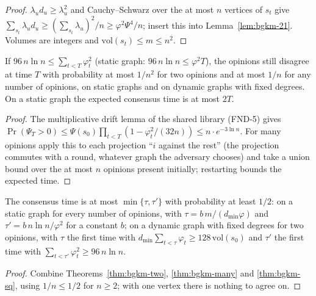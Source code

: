\begin{proof}\leanok
$\lambda_ud_u\ge\lambda_u^2$ and Cauchy--Schwarz over the at most $n$ vertices of $s_t$ give
$\sum_{s_t}\lambda_ud_u\ge(\sum_{s_t}\lambda_u)^2/n\ge\varphi^2\Psi^4/n$; insert this into
Lemma~\ref{lem:bgkm-21}. Volumes are integers and $\mathrm{vol}(s_t)\le m\le n^2$.
\end{proof}
\begin{theorem}\label{thm:bgkm-sq}
\leanok{}
If $96\,n\ln n\le\sum_{t<T}\varphi_t^2$ (static graph: $96\,n\ln n\le\varphi^2T$), the opinions
still disagree at time $T$ with probability at most $1/n^2$ for two opinions and at most $1/n$
for any number of opinions, on static graphs and on dynamic graphs with fixed degrees. On a static
graph the expected consensus time is at most $2T$.
\end{theorem}
\begin{proof}\leanok
The multiplicative drift lemma of the shared library (FND-5) gives
$\Pr(\Psi_T>0)\le\Psi(s_0)\prod_{t<T}(1-\varphi_t^2/(32n))\le n\cdot e^{-3\ln n}$. For many
opinions apply this to each projection ``$i$ against the rest'' (the projection commutes with a
round, whatever graph the adversary chooses) and take a union bound over the at most $n$ opinions
present initially; restarting bounds the expected time.
\end{proof}
\begin{theorem}\label{thm:bgkm-min}
\leanok{}
The consensus time is at most $\min\{\tau,\tau'\}$ with probability at least $1/2$: on a static
graph for every number of opinions, with $\tau=b\,m/(d_{\min}\varphi)$ and
$\tau'=b\,n\ln n/\varphi^2$ for a constant $b$; on a dynamic graph with fixed degrees for two
opinions, with $\tau$ the first time with $d_{\min}\sum_{t<\tau}\varphi_t\ge128\,\mathrm{vol}(s_0)$
and $\tau'$ the first time with $\sum_{t<\tau'}\varphi_t^2\ge96\,n\ln n$.
\end{theorem}
\begin{proof}\leanok
Combine Theorems~\ref{thm:bgkm-two}, \ref{thm:bgkm-many} and \ref{thm:bgkm-sq}, using
$1/n\le1/2$ for $n\ge2$; with one vertex there is nothing to agree on.
\end{proof}

